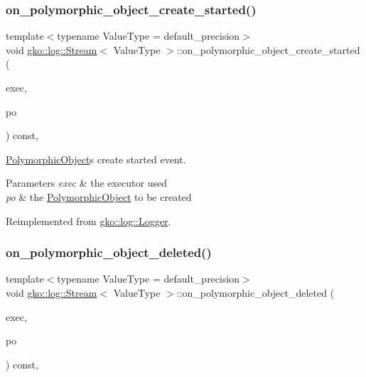 \subsubsection{\texorpdfstring{on\+\_\+polymorphic\+\_\+object\+\_\+create\+\_\+started()}{on\_polymorphic\_object\_create\_started()}}
{\footnotesize\ttfamily template$<$typename Value\+Type  = default\+\_\+precision$>$ \\
void \hyperlink{classgko_1_1log_1_1Stream}{gko\+::log\+::\+Stream}$<$ Value\+Type $>$\+::on\+\_\+polymorphic\+\_\+object\+\_\+create\+\_\+started (\begin{DoxyParamCaption}\item[{const \hyperlink{classgko_1_1Executor}{Executor} $\ast$}]{exec,  }\item[{const \hyperlink{classgko_1_1PolymorphicObject}{Polymorphic\+Object} $\ast$}]{po }\end{DoxyParamCaption}) const\hspace{0.3cm}{\ttfamily [override]}, {\ttfamily [virtual]}}



\hyperlink{classgko_1_1PolymorphicObject}{Polymorphic\+Object}\textquotesingle{}s create started event. 


\begin{DoxyParams}{Parameters}
{\em exec} & the executor used \\
\hline
{\em po} & the \hyperlink{classgko_1_1PolymorphicObject}{Polymorphic\+Object} to be created \\
\hline
\end{DoxyParams}


Reimplemented from \hyperlink{classgko_1_1log_1_1Logger}{gko\+::log\+::\+Logger}.

\mbox{\label{classgko_1_1log_1_1Stream_a2e2c904c50789d4a233202a2481ed6de}} 
\subsubsection{\texorpdfstring{on\+\_\+polymorphic\+\_\+object\+\_\+deleted()}{on\_polymorphic\_object\_deleted()}}
{\footnotesize\ttfamily template$<$typename Value\+Type  = default\+\_\+precision$>$ \\
void \hyperlink{classgko_1_1log_1_1Stream}{gko\+::log\+::\+Stream}$<$ Value\+Type $>$\+::on\+\_\+polymorphic\+\_\+object\+\_\+deleted (\begin{DoxyParamCaption}\item[{const \hyperlink{classgko_1_1Executor}{Executor} $\ast$}]{exec,  }\item[{const \hyperlink{classgko_1_1PolymorphicObject}{Polymorphic\+Object} $\ast$}]{po }\end{DoxyParamCaption}) const\hspace{0.3cm}{\ttfamily [override]}, {\ttfamily [virtual]}}



